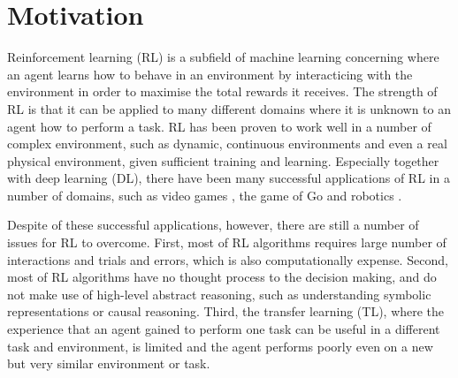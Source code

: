 \section{Motivation}
\label{sec:motivation}
Reinforcement learning (RL) is a subfield of machine learning concerning where an agent learns how to behave in an environment by interacticing with the environment in order to maximise the total rewards it receives.
The strength of RL is that it can be applied to many different domains where it is unknown to an agent how to perform a task. 
RL has been proven to work well in a number of complex environment, such as dynamic, continuous environments and even a real physical environment, given sufficient training and learning.
Especially together with deep learning (DL), there have been many successful applications of RL in a number of domains,
such as video games \cite{Mnih2015}, the game of Go \cite{Silver2016} and robotics \cite{Levine2015}. 

Despite of these successful applications, however, there are still a number of issues for RL to overcome.
First, most of RL algorithms requires large number of interactions and trials and errors, which is also computationally expense.
Second, most of RL algorithms have no thought process to the decision making, and do not make use of high-level abstract reasoning, 
such as understanding symbolic representations or causal reasoning.
Third, the transfer learning (TL), where the experience that an agent gained to perform one task can be useful in a different task and environment, is limited and the agent performs poorly even on a new but very similar environment or task. 

